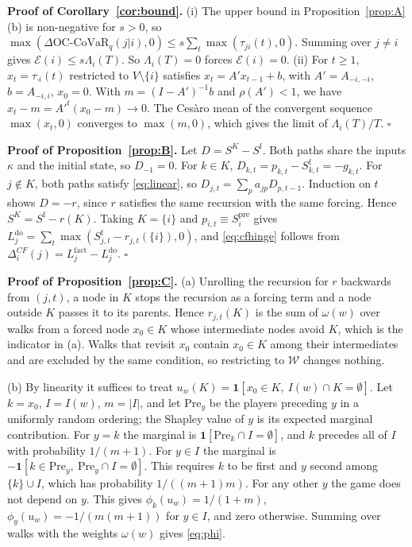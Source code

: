 \documentclass[referee,pdflatex,sn-mathphys-ay]{sn-jnl}
\theoremstyle{thmstyleone}%
\theoremstyle{thmstyletwo}%
\theoremstyle{thmstylethree}%
\newcommand{\doop}{\mathrm{do}}
\newcommand{\OCCoVaR}{\text{OC-CoVaR}}
\begin{document}
\begin{appendices}
\noindent\textbf{Proof of Corollary~\ref{cor:bound}.} (i) The upper bound in Proposition~\ref{prop:A}(b) is non-negative for $s>0$, so
$\max(\Delta\OCCoVaR_q(j|i),0)\le s\sum_t\max(\tau_{ji}(t),0)$. Summing over $j\neq i$ gives $\mathcal{E}(i)\le s\Lambda_i(T)$.
So $\Lambda_i(T)=0$ forces $\mathcal{E}(i)=0$.
(ii) For $t\ge1$, $x_t=\tau_{\cdot i}(t)$ restricted to $V\setminus\{i\}$ satisfies $x_t=A'x_{t-1}+b$, with $A'=A_{-i,-i}$, $b=A_{-i,i}$, $x_0=0$.
With $m=(I-A')^{-1}b$ and $\rho(A')<1$, we have $x_t-m=A'^t(x_0-m)\to0$. The Cesàro mean of the
convergent sequence $\max(x_t,0)$ converges to $\max(m,0)$, which gives the limit of
$\Lambda_i(T)/T$. \hfill$\square$

\noindent\textbf{Proof of Proposition~\ref{prop:B}.} Let $D=S^K-S^{\mathrm f}$. Both paths
share the inputs $\kappa$ and the initial state, so $D_{-1}=0$. For $k\in K$,
$D_{k,t}=p_{k,t}-S^{\mathrm f}_{k,t}=-g_{k,t}$. For $j\notin K$, both paths satisfy
\eqref{eq:linear}, so $D_{j,t}=\sum_pa_{jp}D_{p,t-1}$. Induction on $t$ shows $D=-r$, since
$r$ satisfies the same recursion with the same forcing. Hence $S^K=S^{\mathrm f}-r(K)$.
Taking $K=\{i\}$ and $p_{i,t}\equiv S_i^{\mathrm{pre}}$ gives $L_j^{\doop}=\sum_t\max(S^{\mathrm f}_{j,t}-r_{j,t}(\{i\}),0)$,
and \eqref{eq:cfhinge} follows from $\Delta_i^{CF}(j)=L_j^{\mathrm{fact}}-L_j^{\doop}$. \hfill$\square$

\noindent\textbf{Proof of Proposition~\ref{prop:C}.} (a) Unrolling the recursion for $r$ backwards from $(j,t)$, a node in $K$ stops the recursion as a forcing term and a node outside $K$ passes it to its parents. Hence $r_{j,t}(K)$ is the sum of $\omega(w)$ over walks from a forced node $x_0\in K$ whose intermediate nodes avoid $K$, which is the indicator in (a). Walks that revisit $x_0$ contain $x_0\in K$ among their intermediates and are excluded by the same condition, so restricting to $\mathcal W$ changes nothing.

(b) By linearity it suffices to treat $u_w(K)=\mathbf 1[x_0\in K,\ I(w)\cap K=\emptyset]$. Let
$k=x_0$, $I=I(w)$, $m=|I|$, and let $\mathrm{Pre}_y$ be the players preceding $y$ in a uniformly
random ordering; the Shapley value of $y$ is its expected marginal contribution. For $y=k$ the
marginal is $\mathbf 1[\mathrm{Pre}_k\cap I=\emptyset]$, and $k$ precedes all of $I$ with
probability $1/(m+1)$. For $y\in I$ the marginal is $-\mathbf 1[k\in\mathrm{Pre}_y,\ \mathrm{Pre}_y\cap I=\emptyset]$.
This requires $k$ to be first and $y$ second among $\{k\}\cup I$, which has probability
$1/((m+1)m)$. For any other $y$ the game does not depend on $y$. This gives
$\phi_k(u_w)=1/(1+m)$, $\phi_y(u_w)=-1/(m(m+1))$ for $y\in I$, and zero otherwise. Summing
over walks with the weights $\omega(w)$ gives \eqref{eq:phi}.


\end{appendices}
\end{document}
